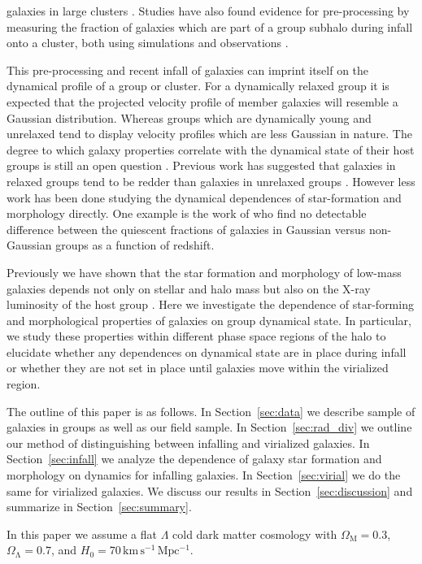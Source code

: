 \documentclass[a4paper,fleqn,usenatbib]{mnras}
\begin{document}
galaxies in large clusters \citep{kodama2001, helsdon2003, moran2007,
  wilman2009}.  Studies
have also found evidence for pre-processing by measuring the fraction
of galaxies which are part of a group subhalo during infall onto a cluster,
both using simulations \citep{mcgee2009, delucia2012, bahe2013} and
observations \citep{dressler2013, hou2014}.
\par
This pre-processing and recent infall of galaxies can imprint
itself on the dynamical profile of a group or cluster.  For a
dynamically relaxed group it is expected that the projected velocity profile of member
galaxies will resemble a Gaussian distribution.  Whereas groups which
are dynamically young and unrelaxed tend to display velocity
profiles which are less Gaussian in nature.  The degree to which
galaxy properties correlate with the dynamical state of their host
groups is still an open question \citep[e.g.][]{biviano2002,
  ribeiro2013b}.  Previous work has suggested that 
galaxies in relaxed groups tend to be redder than galaxies in
unrelaxed groups \citep{ribeiro2010, carollo2013, ribeiro2013}.
However less work has been done studying the dynamical dependences of
star-formation and morphology directly.  One example is the work of
\citet{hou2013} who find no detectable difference between the
quiescent fractions
of galaxies in Gaussian versus non-Gaussian groups as a function of redshift.
\par
Previously we have shown that the star formation and morphology of
low-mass galaxies depends not only on stellar and halo mass but also
on the X-ray luminosity of the host group \citep{roberts2016}.  Here
we investigate the dependence of star-forming and 
morphological properties of galaxies on group dynamical state.  In
particular, we study these properties within different phase space regions
of the halo to elucidate whether any dependences on dynamical state
are in place during infall or whether they are not set in place until
galaxies move within the virialized region.
\par
The outline of this paper is as follows.  In Section~\ref{sec:data} we
describe sample of galaxies in groups as well as our field sample.  In
Section~\ref{sec:rad_div} we outline our method of distinguishing
between infalling and virialized galaxies.  In
Section~\ref{sec:infall} we analyze the dependence of galaxy star
formation and morphology on dynamics for infalling galaxies.  In
Section~\ref{sec:virial} we do the same for virialized galaxies.  We
discuss our results in Section~\ref{sec:discussion} and summarize in
Section~\ref{sec:summary}.
\par
In this paper we assume a flat $\Lambda$ cold dark matter cosmology
with $\Omega_\mathrm{M} = 0.3$, $\Omega_\mathrm{\Lambda} = 0.7$, and
$H_0 = 70\,\mathrm{km}\,\mathrm{s^{-1}}\,\mathrm{Mpc^{-1}}$.
\end{document}

